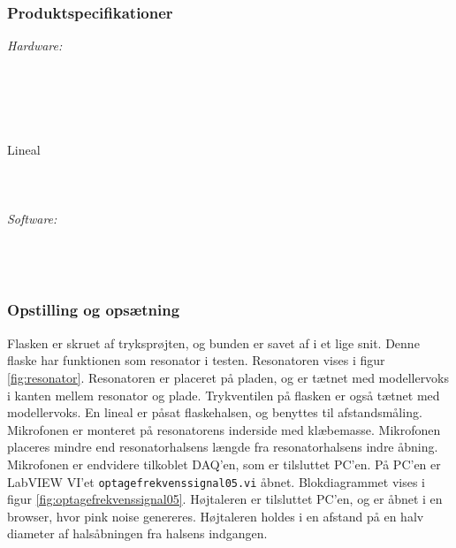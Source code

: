 {	\subsubsection{Produktspecifikationer}
	\textit{Hardware:}\\
	\\
	\elektretto\\
	\daq\\
	\\	
	\snot\\	
	Lineal\\
	\modellervoks\\
	\plade\\
	\PC\\
	
	\textit{Software:}\\
	\labview\\
	\daqsoft\\
	\onlineg\\
	
	\subsubsection{Opstilling og opsætning}
	Flasken er skruet af tryksprøjten, og bunden er savet af i et lige snit. Denne flaske har funktionen som resonator i testen. Resonatoren vises i figur \ref{fig:resonator}. Resonatoren er placeret på pladen, og er tætnet med modellervoks i kanten mellem resonator og plade. Trykventilen på flasken er også tætnet med modellervoks. En lineal er påsat flaskehalsen, og benyttes til afstandsmåling. Mikrofonen er monteret på resonatorens inderside med klæbemasse. Mikrofonen placeres mindre end resonatorhalsens længde fra  resonatorhalsens indre åbning. Mikrofonen er endvidere tilkoblet DAQ'en, som er tilsluttet PC'en. På PC'en er LabVIEW VI'et \texttt{optagefrekvenssignal05.vi} åbnet. Blokdiagrammet vises i figur \ref{fig:optagefrekvenssignal05}. Højtaleren er tilsluttet PC'en, og \onlineg er åbnet i en browser, hvor pink noise genereres. Højtaleren holdes i en afstand på en halv diameter af halsåbningen fra halsens indgangen.  
	
}
